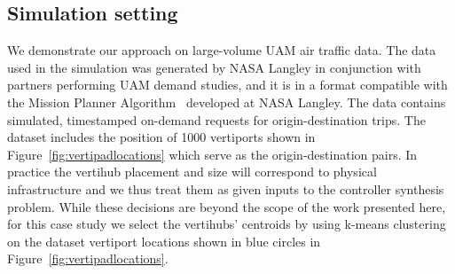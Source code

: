 

\subsection{Simulation setting}
We demonstrate our approach on large-volume UAM air traffic data. The data used in the simulation was generated by NASA Langley in conjunction with partners performing UAM demand studies, and it is in a format compatible with the Mission Planner Algorithm~\cite{guerreiro2019mission} developed at NASA Langley. The data contains simulated, timestamped on-demand requests for origin-destination trips. The dataset includes the position of 1000 vertiports shown in Figure~\ref{fig:vertipadlocations} which serve as the origin-destination pairs. 
In practice the vertihub placement and size will correspond to physical infrastructure and we thus treat them as given inputs to the controller synthesis problem. While these decisions are beyond the scope of the work presented here, for this case study we select the vertihubs' centroids by using k-means clustering on the dataset vertiport locations shown in blue circles in Figure~\ref{fig:vertipadlocations}.


